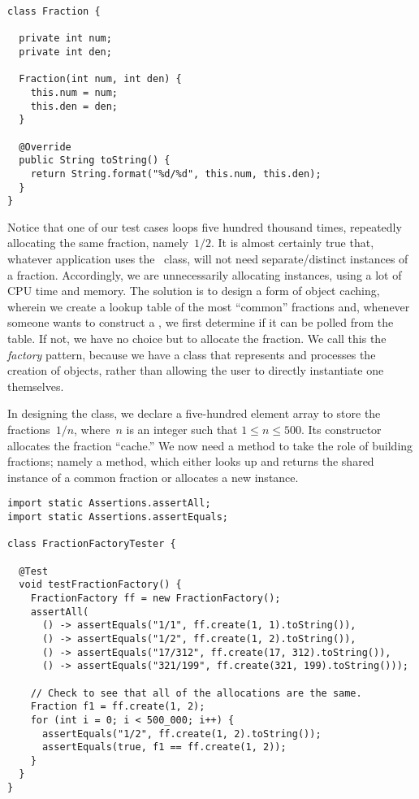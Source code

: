 \enlargethispage{-3\baselineskip}
\begin{lstlisting}[language=MyJava]
class Fraction {

  private int num;
  private int den;

  Fraction(int num, int den) {
    this.num = num;
    this.den = den;
  }

  @Override
  public String toString() { 
    return String.format("%d/%d", this.num, this.den); 
  }
}
\end{lstlisting}

Notice that one of our test cases loops five hundred thousand times, repeatedly allocating the same fraction, namely~$1/2$. 
It is almost certainly true that, whatever application uses the~ class, will not need separate/distinct instances of a fraction. 
Accordingly, we are unnecessarily allocating  instances, using a lot of CPU time and memory. 
The solution is to design a form of object caching, wherein we create a lookup table of the most ``common'' fractions and, whenever someone wants to construct a , we first determine if it can be polled from the table. 
If not, we have no choice but to allocate the fraction. 
We call this the \emph{factory} pattern, because we have a class that represents and processes the creation of  objects, rather than allowing the user to directly instantiate one themselves. 

In designing the  class, we declare a five-hundred element array to store the fractions~$1/n$, where~$n$ is an integer such that $1 \leq n \leq 500$. 
Its constructor allocates the fraction ``cache.'' 
We now need a method to take the role of building fractions; namely a  method, which either looks up and returns the shared instance of a common fraction or allocates a new instance.

\begin{lstlisting}[language=MyJava]
import static Assertions.assertAll;
import static Assertions.assertEquals;

class FractionFactoryTester {

  @Test
  void testFractionFactory() {
    FractionFactory ff = new FractionFactory();
    assertAll(
      () -> assertEquals("1/1", ff.create(1, 1).toString()),
      () -> assertEquals("1/2", ff.create(1, 2).toString()),
      () -> assertEquals("17/312", ff.create(17, 312).toString()),
      () -> assertEquals("321/199", ff.create(321, 199).toString()));

    // Check to see that all of the allocations are the same.
    Fraction f1 = ff.create(1, 2);
    for (int i = 0; i < 500_000; i++) {
      assertEquals("1/2", ff.create(1, 2).toString());
      assertEquals(true, f1 == ff.create(1, 2));
    }
  }
}
\end{lstlisting}

